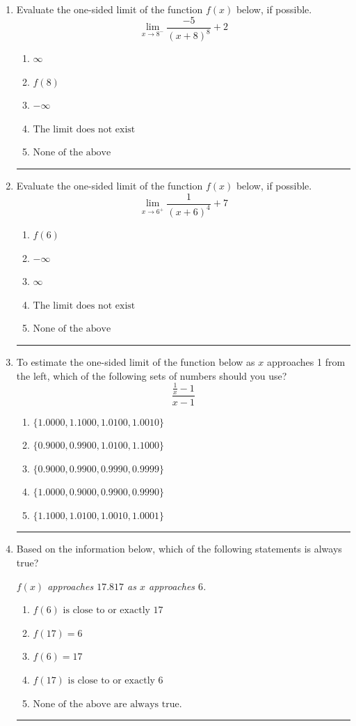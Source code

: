 \documentclass[14pt]{extbook}
\newcommand{\litem}[1]{\item#1\hspace*{-1cm}\rule{\textwidth}{0.4pt}}
\begin{document}
\begin{enumerate}
{\begin{enumerate}[label=\Alph*.]
\end{enumerate} }
\litem{
Evaluate the one-sided limit of the function $f(x)$ below, if possible.\[ \lim_{x \rightarrow 8^-} \frac{-5}{(x+8)^8}+2 \]\begin{enumerate}[label=\Alph*.]
\item \( \infty \)
\item \( f(8) \)
\item \( -\infty \)
\item \( \text{The limit does not exist} \)
\item \( \text{None of the above} \)

\end{enumerate} }
\litem{
Evaluate the one-sided limit of the function $f(x)$ below, if possible.\[ \lim_{x \rightarrow 6^+} \frac{1}{(x+6)^4}+7 \]\begin{enumerate}[label=\Alph*.]
\item \( f(6) \)
\item \( -\infty \)
\item \( \infty \)
\item \( \text{The limit does not exist} \)
\item \( \text{None of the above} \)

\end{enumerate} }
\litem{
To estimate the one-sided limit of the function below as $x$ approaches 1 from the left, which of the following sets of numbers should you use?\[ \frac{\frac{1}{x} - 1}{x - 1} \]\begin{enumerate}[label=\Alph*.]
\item \( \{ 1.0000, 1.1000, 1.0100, 1.0010 \} \)
\item \( \{ 0.9000, 0.9900, 1.0100, 1.1000 \} \)
\item \( \{ 0.9000, 0.9900, 0.9990, 0.9999 \} \)
\item \( \{ 1.0000, 0.9000, 0.9900, 0.9990 \} \)
\item \( \{ 1.1000, 1.0100, 1.0010, 1.0001 \} \)

\end{enumerate} }
\litem{
Based on the information below, which of the following statements is always true?
\begin{center}
    \textit{ $f(x)$ approaches $17.817$ as $x$ approaches $6$. }
\end{center}
\begin{enumerate}[label=\Alph*.]
\item \( f(6) \text{ is close to or exactly } 17 \)
\item \( f(17) = 6 \)
\item \( f(6) = 17 \)
\item \( f(17) \text{ is close to or exactly } 6 \)
\item \( \text{None of the above are always true.} \)


\end{enumerate}}
\end{enumerate}
\end{document}
